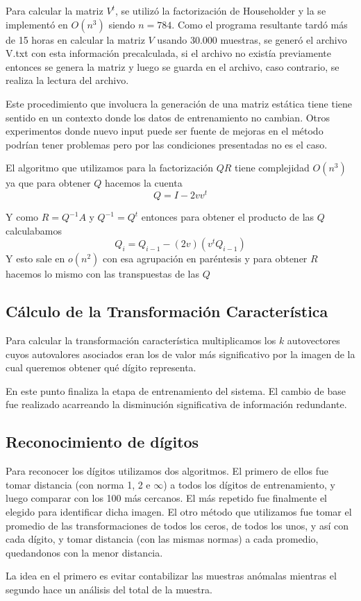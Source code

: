 Para calcular la matriz $V^t$, se utiliz\'o la factorizaci\'on de Householder y la se implement\'o en $O(n^3)$
siendo $n = 784$. Como el programa resultante tard\'o m\'as de 15 horas en calcular la matriz $V$ usando 30.000 muestras,
se gener\'o el archivo V.txt con esta informaci\'on precalculada, si el archivo no exist\'ia previamente
entonces se genera la matriz y luego se guarda en el archivo, caso contrario, se realiza la lectura del archivo.

Este procedimiento que involucra la generaci\'on de una matriz est\'atica tiene tiene sentido en un contexto
donde los datos de entrenamiento no cambian. Otros experimentos donde nuevo input puede ser fuente de mejoras
en el m\'etodo podr\'ian tener problemas pero por las condiciones presentadas no es el caso.

El algoritmo que utilizamos para la factorizaci\'on $QR$ tiene complejidad $O(n^3)$ ya que para obtener $Q$ hacemos la cuenta
$$Q = I - 2vv^t$$

Y como $R = Q^{-1}A$ y $Q^{-1} = Q^t$ entonces para obtener el producto de las $Q$ calculabamos
$$Q_i = Q_{i-1} - (2v)(v^t Q_{i-1})$$
Y esto sale en $o(n^2)$ con esa agrupaci\'on en par\'entesis y para obtener $R$ hacemos lo mismo con las transpuestas de las $Q$

\subsection{C\'alculo de la Transformaci\'on Caracter\'istica}

Para calcular la transformaci\'on caracter\'istica multiplicamos los $k$
autovectores cuyos autovalores asociados eran los de valor m\'as significativo
por la imagen de la cual queremos obtener qu\'e d\'igito representa.

En este punto finaliza la etapa de entrenamiento del sistema. El cambio de base
fue realizado acarreando la disminuci\'on significativa de informaci\'on
redundante.

\subsection{Reconocimiento de d\'igitos}
Para reconocer los d\'igitos utilizamos dos algoritmos. El primero de ellos fue tomar distancia (con norma 1, 2 e $\infty$) a
todos los d\'igitos de entrenamiento, y luego comparar con los 100 m\'as cercanos. El m\'as repetido fue finalmente
el elegido para identificar dicha imagen. El otro m\'etodo que utilizamos fue tomar el promedio de las transformaciones
de todos los ceros, de todos los unos, y as\'i con cada d\'igito, y tomar distancia (con las mismas normas)
a cada promedio, quedandonos con la menor distancia.

La idea en el primero es evitar contabilizar las muestras an\'omalas mientras el
segundo hace un an\'alisis del total de la muestra.
